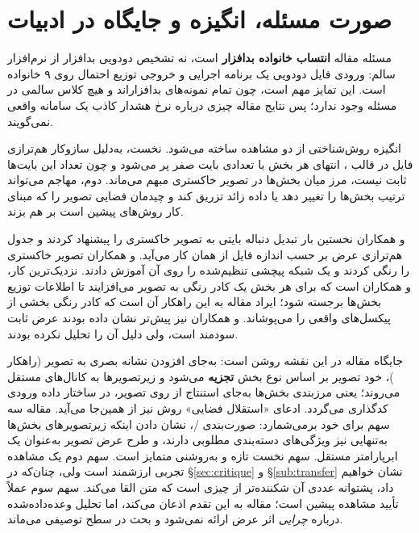 \section{صورت مسئله، انگیزه و جایگاه در ادبیات}
\label{sec:problem}

مسئله مقاله \textbf{انتساب خانواده بدافزار} است، نه تشخیص دودویی بدافزار از نرم‌افزار سالم: ورودی فایل دودویی یک برنامه اجرایی و خروجی توزیع احتمال روی ۹ خانواده است. این تمایز مهم است، چون تمام نمونه‌های  بدافزار‌اند و هیچ کلاس سالمی در مسئله وجود ندارد؛ پس نتایج مقاله چیزی درباره نرخ هشدار کاذب یک سامانه واقعی نمی‌گویند.

انگیزه روش‌شناختی از دو مشاهده ساخته می‌شود. نخست، به‌دلیل سازوکار هم‌ترازی فایل در قالب ، انتهای هر بخش با تعدادی بایت صفر پر می‌شود و چون تعداد این بایت‌ها ثابت نیست، مرز میان بخش‌ها در تصویر خاکستری مبهم می‌ماند. دوم، مهاجم می‌تواند ترتیب بخش‌ها را تغییر دهد یا داده زائد تزریق کند و چیدمان فضایی تصویر را که مبنای کار روش‌های پیشین است بر هم بزند.

 و همکاران \cite{nataraj2011images} نخستین بار تبدیل دنباله بایتی به تصویر خاکستری را پیشنهاد کردند و جدول هم‌ترازی عرض بر حسب اندازه فایل از همان کار می‌آید.  و همکاران \cite{vasan2020imcfn} تصویر خاکستری را رنگی کردند و یک شبکه پیچشی تنظیم‌شده را روی آن آموزش دادند. نزدیک‌ترین کار،  و همکاران \cite{xiao2021section} است که برای هر بخش یک کادر رنگی به تصویر می‌افزایند تا اطلاعات توزیع بخش‌ها برجسته شود؛ ایراد مقاله به این راهکار آن است که کادر رنگی بخشی از پیکسل‌های واقعی را می‌پوشاند.  و همکاران \cite{chaganti2022efficientnet} نیز پیش‌تر نشان داده بودند عرض ثابت سودمند است، ولی دلیل آن را تحلیل نکرده بودند.

جایگاه مقاله در این نقشه روشن است: به‌جای افزودن نشانه بصری به تصویر (راهکار )، خود تصویر بر اساس نوع بخش \textbf{تجزیه} می‌شود و زیرتصویر‌ها به کانال‌های مستقل می‌روند؛ یعنی مرزبندی بخش‌ها به‌جای استنتاج از روی تصویر، در ساختار داده ورودی کدگذاری می‌گردد. ادعای «استقلال فضایی» روش نیز از همین‌جا می‌آید. مقاله سه سهم برای خود برمی‌شمارد: صورت‌بندی /، نشان دادن اینکه زیرتصویر‌های بخش‌ها به‌تنهایی نیز ویژگی‌های دسته‌بندی مطلوبی دارند، و طرح عرض تصویر به‌عنوان یک ابرپارامتر مستقل. سهم نخست تازه و به‌روشنی متمایز است. سهم دوم یک مشاهده تجربی ارزشمند است ولی، چنان‌که در \S\ref{sec:critique} و \S\ref{sub:transfer} نشان خواهیم داد، پشتوانه عددی آن شکننده‌تر از چیزی است که متن القا می‌کند. سهم سوم عملاً تأیید مشاهده پیشین  است؛ مقاله به این تقدم اذعان می‌کند، اما تحلیل وعده‌داده‌شده درباره \emph{چرایی} اثر عرض ارائه نمی‌شود و بحث در سطح توصیفی می‌ماند.
